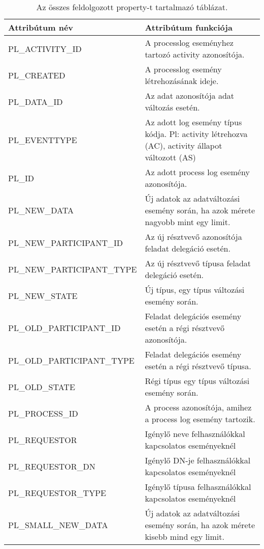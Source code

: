 \begin{table}
\small
\caption{Az összes feldolgozott property-t tartalmazó táblázat.} 

\begin{tabular}{lp{10cm}}
	Attribútum név & Attribútum funkciója \\
	\toprule
	PL\_ACTIVITY\_ID & A processlog eseményhez tartozó activity azonosítója. \\
	PL\_CREATED & A processlog esemény létrehozásának ideje. \\
	PL\_DATA\_ID & Az adat azonosítója adat változás esetén. \\
	PL\_EVENTTYPE & Az adott log esemény típus kódja. Pl: activity létrehozva (AC), activity állapot változott (AS) \\
	PL\_ID & Az adott process log esemény azonosítója. \\
	PL\_NEW\_DATA & Új adatok az adatváltozási esemény során, ha azok mérete nagyobb mint egy limit. \\
	PL\_NEW\_PARTICIPANT\_ID & Az új résztvevő azonosítója feladat delegáció esetén. \\
	PL\_NEW\_PARTICIPANT\_TYPE & Az új résztvevő típusa feladat delegáció esetén. \\
	PL\_NEW\_STATE & Új típus, egy típus változási esemény során. \\
	PL\_OLD\_PARTICIPANT\_ID & Feladat delegációs esemény esetén a régi résztvevő azonosítója. \\
	PL\_OLD\_PARTICIPANT\_TYPE & Feladat delegációs esemény esetén a régi résztvevő típusa. \\
	PL\_OLD\_STATE & Régi típus egy típus változási esemény során. \\
	PL\_PROCESS\_ID & A process azonosítója, amihez a process log esemény tartozik. \\
	PL\_REQUESTOR & Igénylő neve felhasználókkal kapcsolatos eseményeknél \\
	PL\_REQUESTOR\_DN & Igénylő DN-je felhasználókkal kapcsolatos eseményeknél \\
	PL\_REQUESTOR\_TYPE & Igénylő típusa felhasználókkal kapcsolatos eseményeknél \\
	PL\_SMALL\_NEW\_DATA & Új adatok az adatváltozási esemény során, ha azok mérete kisebb mind egy limit. \\
\end{tabular}
\end{table}



